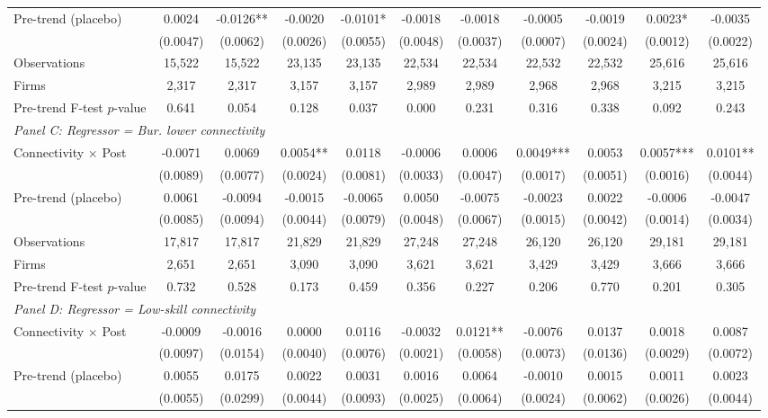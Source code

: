 \begin{table}[H]
\begin{threeparttable}
\begin{tabular}{lcccccccccc}
\quad Pre-trend (placebo) & 0.0024 & -0.0126** & -0.0020 & -0.0101* & -0.0018 & -0.0018 & -0.0005 & -0.0019 & 0.0023* & -0.0035 \\
 & (0.0047) & (0.0062) & (0.0026) & (0.0055) & (0.0048) & (0.0037) & (0.0007) & (0.0024) & (0.0012) & (0.0022) \\
\quad Observations & 15,522 & 15,522 & 23,135 & 23,135 & 22,534 & 22,534 & 22,532 & 22,532 & 25,616 & 25,616 \\
\quad Firms & 2,317 & 2,317 & 3,157 & 3,157 & 2,989 & 2,989 & 2,968 & 2,968 & 3,215 & 3,215 \\
\quad Pre-trend F-test $p$-value & 0.641 & 0.054 & 0.128 & 0.037 & 0.000 & 0.231 & 0.316 & 0.338 & 0.092 & 0.243 \\[6pt]
\multicolumn{11}{l}{\textit{Panel C: Regressor = Bur. lower connectivity}} \\
\quad Connectivity $\times$ Post & -0.0071 & 0.0069 & 0.0054** & 0.0118 & -0.0006 & 0.0006 & 0.0049*** & 0.0053 & 0.0057*** & 0.0101** \\
 & (0.0089) & (0.0077) & (0.0024) & (0.0081) & (0.0033) & (0.0047) & (0.0017) & (0.0051) & (0.0016) & (0.0044) \\
\quad Pre-trend (placebo) & 0.0061 & -0.0094 & -0.0015 & -0.0065 & 0.0050 & -0.0075 & -0.0023 & 0.0022 & -0.0006 & -0.0047 \\
 & (0.0085) & (0.0094) & (0.0044) & (0.0079) & (0.0048) & (0.0067) & (0.0015) & (0.0042) & (0.0014) & (0.0034) \\
\quad Observations & 17,817 & 17,817 & 21,829 & 21,829 & 27,248 & 27,248 & 26,120 & 26,120 & 29,181 & 29,181 \\
\quad Firms & 2,651 & 2,651 & 3,090 & 3,090 & 3,621 & 3,621 & 3,429 & 3,429 & 3,666 & 3,666 \\
\quad Pre-trend F-test $p$-value & 0.732 & 0.528 & 0.173 & 0.459 & 0.356 & 0.227 & 0.206 & 0.770 & 0.201 & 0.305 \\[6pt]
\multicolumn{11}{l}{\textit{Panel D: Regressor = Low-skill connectivity}} \\
\quad Connectivity $\times$ Post & -0.0009 & -0.0016 & 0.0000 & 0.0116 & -0.0032 & 0.0121** & -0.0076 & 0.0137 & 0.0018 & 0.0087 \\
 & (0.0097) & (0.0154) & (0.0040) & (0.0076) & (0.0021) & (0.0058) & (0.0073) & (0.0136) & (0.0029) & (0.0072) \\
\quad Pre-trend (placebo) & 0.0055 & 0.0175 & 0.0022 & 0.0031 & 0.0016 & 0.0064 & -0.0010 & 0.0015 & 0.0011 & 0.0023 \\
 & (0.0055) & (0.0299) & (0.0044) & (0.0093) & (0.0025) & (0.0064) & (0.0024) & (0.0062) & (0.0026) & (0.0044) \\

\end{tabular}
\end{threeparttable}
\end{table}
